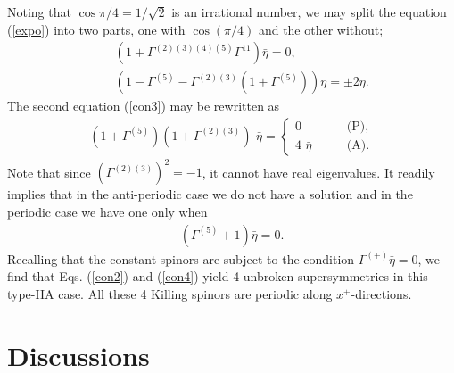 \documentclass[a4paper,12pt]{article}
\begin{document}
Noting that $\cos{\pi/4}=1/\sqrt{2}$ is an irrational number,
we may split the equation (\ref{expo}) into two parts, one with $\cos(\pi/4)$ 
and the other without;
\begin{eqnarray}
&&\left(1+\Gamma^{(2)(3)(4)(5)}\Gamma^{11}\right)\bar{\eta}=0,\label{con2}\\
&&\left(1-\Gamma^{(5)}-\Gamma^{(2)(3)}\left(1+\Gamma^{(5)}\right)\right)\bar{\eta}=\pm2\bar{\eta}\label{con3}.
\end{eqnarray}
The second equation (\ref{con3}) may be rewritten as 
\begin{eqnarray}
(1+ \Gamma^{(5)})(1+ \Gamma^{(2)(3)}) \,\,\bar{\eta} =
\left\{\begin{array}{ll}
   0 & \qquad \mbox{(P)}, \\
   4 \,\,\bar{\eta} & \qquad \mbox{(A)}.
\end{array} \right.
\end{eqnarray}
Note that since $(\Gamma^{(2)(3)})^2 = -1$, it cannot have real 
eigenvalues. It readily implies that in the anti-periodic case we
do not have a solution and in the periodic case we have one only when 
\begin{eqnarray}\label{con4}
\left(\Gamma^{(5)}+1\right)\bar{\eta}=0.
\end{eqnarray}
Recalling that the constant spinors are subject to the 
condition $\Gamma^{(+)}\bar{\eta}=0$, we find that Eqs. (\ref{con2}) 
and (\ref{con4}) yield 4 unbroken supersymmetries in this type-IIA case. 
All these 4 Killing spinors are periodic along $x^+$-directions.

\section{Discussions}\label{vii}
\end{document}
